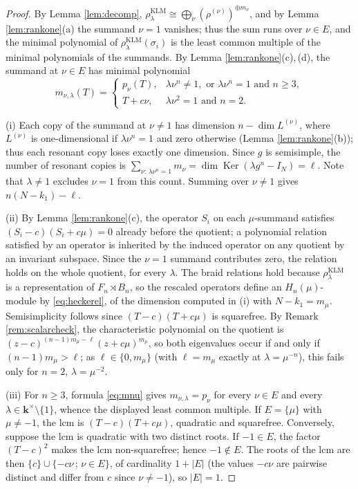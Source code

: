 \documentclass[11pt]{article}
\theoremstyle{definition}
\theoremstyle{remark}
\newcommand{\Ker}{\operatorname{Ker}}
\newcommand{\kk}{\boldsymbol{k}}
\newcommand{\rKLM}{\rho^{\mathrm{KLM}}_{\lambda}}
\begin{document}
\begin{proof}
By Lemma \ref{lem:decomp}, $\rKLM \cong \bigoplus_{\nu}
(\rho^{(\nu)})^{\oplus m_{\nu}}$, and by Lemma \ref{lem:rankone}(a) the
summand $\nu = 1$ vanishes; thus the sum runs over $\nu \in E$, and the
minimal polynomial of $\rKLM(\sigma_i)$ is the least common multiple of
the minimal polynomials of the summands. By Lemma
\ref{lem:rankone}(c),\,(d), the summand at $\nu \in E$ has minimal
polynomial
\begin{equation}\label{eq:mnu}
m_{\nu,\lambda}(T) =
\begin{cases}
p_\nu(T), & \lambda\nu^n \neq 1, \text{ or } \lambda\nu^n = 1 \text{ and }
n \geq 3,\\
T + c\nu, & \lambda\nu^2 = 1 \text{ and } n = 2.
\end{cases}
\end{equation}

(i) Each copy of the summand at $\nu \neq 1$ has dimension
$n - \dim L^{(\nu)}$, where $L^{(\nu)}$ is one-dimensional if
$\lambda \nu^n = 1$ and zero otherwise (Lemma \ref{lem:rankone}(b));
thus each resonant copy loses exactly one dimension. Since $g$ is
semisimple, the number of resonant copies is
$\sum_{\nu:\, \lambda\nu^n = 1} m_{\nu} = \dim\Ker(\lambda g^n - I_N)
= \ell$. Note that $\lambda \neq 1$ excludes $\nu = 1$ from this count.
Summing over $\nu \neq 1$ gives $n(N - k_1) - \ell$.

(ii) By Lemma \ref{lem:rankone}(c), the operator $S_i$ on each
$\mu$-summand satisfies $(S_i - c)(S_i + c\mu) = 0$ already before the
quotient; a polynomial relation satisfied by an operator is inherited by
the induced operator on any quotient by an invariant subspace. Since the
$\nu = 1$ summand contributes zero, the relation holds on the whole
quotient, for every $\lambda$. The braid relations hold because $\rKLM$
is a representation of $F_n \rtimes B_n$, so the rescaled operators
define an $H_n(\mu)$-module by \eqref{eq:heckerel}, of the dimension
computed in (i) with $N - k_1 = m_\mu$. Semisimplicity follows since
$(T - c)(T + c\mu)$ is squarefree. By Remark \ref{rem:scalarcheck}, the
characteristic polynomial on the quotient is
$(z - c)^{(n-1)m_\mu - \ell}(z + c\mu)^{m_\mu}$, so both eigenvalues
occur if and only if $(n-1)m_\mu > \ell$; as $\ell \in \{0, m_\mu\}$
(with $\ell = m_\mu$ exactly at $\lambda = \mu^{-n}$), this fails only
for $n = 2$, $\lambda = \mu^{-2}$.

(iii) For $n \geq 3$, formula \eqref{eq:mnu} gives
$m_{\nu,\lambda} = p_\nu$ for every $\nu \in E$ and every
$\lambda \in \kk^{\times} \setminus \{1\}$, whence the displayed least common multiple. If
$E = \{\mu\}$ with $\mu \neq -1$, the lcm is $(T - c)(T + c\mu)$,
quadratic and squarefree. Conversely, suppose the lcm is quadratic with
two distinct roots. If $-1 \in E$, the factor $(T - c)^2$ makes the lcm
non-squarefree; hence $-1 \notin E$. The roots of the lcm are then
$\{c\} \cup \{-c\nu \,;\, \nu \in E\}$, of cardinality $1 + |E|$ (the
values $-c\nu$ are pairwise distinct and differ from $c$ since
$\nu \neq -1$), so $|E| = 1$.


\end{proof}
\end{document}
